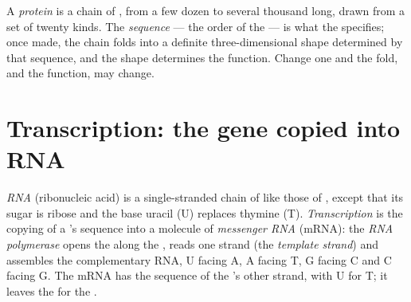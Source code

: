 \begin{definition}\label{def:g11:gene-expression:protein}
A \emph{protein} is a chain of , from a few
dozen to several thousand long, drawn from a set of twenty kinds. The
\emph{sequence} --- the order of the  --- is what the 
specifies; once made, the chain folds into a definite
three-dimensional shape determined by that sequence, and the shape
determines the function. Change one  and the fold, and the
function, may change.
\end{definition}

\section{Transcription: the gene copied into RNA}

\begin{definition}\label{def:g11:gene-expression:transcription}
\emph{RNA} (ribonucleic acid) is a single-stranded chain of
 like those of , except that its sugar is ribose and the
base uracil (U) replaces thymine (T). \emph{Transcription}
is the copying of a 's sequence into a molecule of
\emph{messenger RNA} (mRNA): the 
\emph{RNA polymerase} opens the  along the , reads one
strand (the \emph{template strand}) and assembles the complementary
RNA, U facing A, A facing T, G facing C and C facing G. The mRNA has
the sequence of the 's other strand, with U for T; it leaves the
 for the .
\end{definition}

